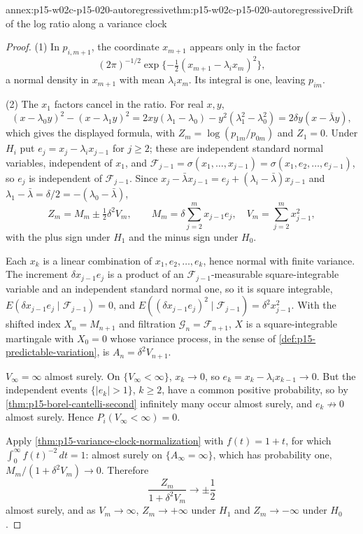 \begin{annexitem}{annex:p15-w02c-p15-020-autoregressive}{thm:p15-w02c-p15-020-autoregressive}{Drift of the log ratio along a variance clock}
\begin{proof}
(1) In \(p_{i,m+1}\), the coordinate \(x_{m+1}\) appears only in the
factor
\[
 (2\pi)^{-1/2}\exp\{-\tfrac12(x_{m+1}-\lambda_ix_m)^2\},
\]
a
normal density in \(x_{m+1}\) with mean \(\lambda_ix_m\). Its integral
is one, leaving \(p_{im}\).

(2) The \(x_1\) factors cancel in the ratio. For real \(x,y\),
\[
 (x-\lambda_0y)^2-(x-\lambda_1y)^2
 =2xy(\lambda_1-\lambda_0)-y^2(\lambda_1^2-\lambda_0^2)
 =2\delta y(x-\bar\lambda y),
\]
which gives the displayed formula, with \(Z_m=\log(p_{1m}/p_{0m})\) and
\(Z_1=0\). Under \(H_i\) put \(e_j=x_j-\lambda_ix_{j-1}\) for
\(j\geq2\); these are independent standard normal variables, independent
of \(x_1\), and \(\mathcal F_{j-1}=\sigma(x_1,\ldots,x_{j-1})
=\sigma(x_1,e_2,\ldots,e_{j-1})\), so \(e_j\) is independent of
\(\mathcal F_{j-1}\). Since
\(x_j-\bar\lambda x_{j-1}=e_j+(\lambda_i-\bar\lambda)x_{j-1}\) and
\(\lambda_1-\bar\lambda=\delta/2=-(\lambda_0-\bar\lambda)\),
\[
 Z_m=M_m\pm\tfrac12\delta^2V_m,\qquad
 M_m=\delta\sum_{j=2}^mx_{j-1}e_j,\quad
 V_m=\sum_{j=2}^mx_{j-1}^2,
\]
with the plus sign under \(H_1\) and the minus sign under \(H_0\).

Each \(x_k\) is a linear combination of \(x_1,e_2,\ldots,e_k\), hence
normal with finite variance. The increment \(\delta x_{j-1}e_j\) is a
product of an \(\mathcal F_{j-1}\)-measurable square-integrable variable
and an independent standard normal one, so it is square integrable,
\(E(\delta x_{j-1}e_j\mid\mathcal F_{j-1})=0\), and
\(E((\delta x_{j-1}e_j)^2\mid\mathcal F_{j-1})=\delta^2x_{j-1}^2\).
With the shifted index \(X_n=M_{n+1}\) and filtration
\(\mathcal G_n=\mathcal F_{n+1}\), \(X\) is a square-integrable
martingale with \(X_0=0\) whose variance process, in the sense of
\cref{def:p15-predictable-variation}, is \(A_n=\delta^2V_{n+1}\).

\(V_\infty=\infty\) almost surely. On \(\{V_\infty<\infty\}\),
\(x_k\to0\), so \(e_k=x_k-\lambda_ix_{k-1}\to0\). But the independent
events \(\{|e_k|>1\}\), \(k\geq2\), have a common positive probability,
so by \cref{thm:p15-borel-cantelli-second} infinitely many occur almost
surely, and \(e_k\not\to0\) almost surely. Hence
\(P_i(V_\infty<\infty)=0\).

Apply \cref{thm:p15-variance-clock-normalization} with \(f(t)=1+t\),
for which \(\int_0^\infty f(t)^{-2}\,dt=1\): almost surely on
\(\{A_\infty=\infty\}\), which has probability one,
\(M_m/(1+\delta^2V_m)\to0\). Therefore
\[
 \frac{Z_m}{1+\delta^2V_m}\longrightarrow\pm\frac12
\]
almost surely, and as \(V_m\to\infty\), \(Z_m\to+\infty\) under \(H_1\)
and \(Z_m\to-\infty\) under \(H_0\).


\end{proof}
\end{annexitem}
